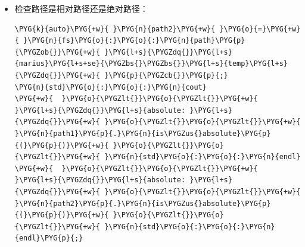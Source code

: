 \begin{itemize}
\begin{codeblockbg}
\begin{Verbatim}[commandchars=\\\{\},breaklines=true,breakanywhere=true,fontsize=\codefont,xleftmargin=17bp]
\PYG{+w}{  }\PYG{o}{\PYGZlt{}}\PYG{o}{\PYGZlt{}}\PYG{+w}{ }\PYG{l+s}{\PYGZdq{}}\PYG{l+s}{has stem: }\PYG{l+s}{\PYGZdq{}}\PYG{+w}{ }\PYG{o}{\PYGZlt{}}\PYG{o}{\PYGZlt{}}\PYG{+w}{ }\PYG{n}{path}\PYG{p}{.}\PYG{n}{has\PYGZus{}stem}\PYG{p}{(}\PYG{p}{)}\PYG{+w}{ }\PYG{o}{\PYGZlt{}}\PYG{o}{\PYGZlt{}}\PYG{+w}{ }\PYG{n}{std}\PYG{o}{:}\PYG{o}{:}\PYG{n}{endl}
\PYG{+w}{  }\PYG{o}{\PYGZlt{}}\PYG{o}{\PYGZlt{}}\PYG{+w}{ }\PYG{l+s}{\PYGZdq{}}\PYG{l+s}{has extension: }\PYG{l+s}{\PYGZdq{}}\PYG{+w}{ }\PYG{o}{\PYGZlt{}}\PYG{o}{\PYGZlt{}}\PYG{+w}{ }\PYG{n}{path}\PYG{p}{.}\PYG{n}{has\PYGZus{}extension}\PYG{p}{(}\PYG{p}{)}\PYG{+w}{ }\PYG{o}{\PYGZlt{}}\PYG{o}{\PYGZlt{}}\PYG{+w}{ }\PYG{n}{std}\PYG{o}{:}\PYG{o}{:}\PYG{n}{endl}\PYG{p}{;}
\end{Verbatim}
\end{codeblockbg}



\item 检查路径是相对路径还是绝对路径：



\begin{codeblockbg}
\begin{Verbatim}[commandchars=\\\{\},breaklines=true,breakanywhere=true,fontsize=\codefont,xleftmargin=17bp]
\PYG{k}{auto}\PYG{+w}{ }\PYG{n}{path2}\PYG{+w}{ }\PYG{o}{=}\PYG{+w}{ }\PYG{n}{fs}\PYG{o}{:}\PYG{o}{:}\PYG{n}{path}\PYG{p}{\PYGZob{}}\PYG{+w}{ }\PYG{l+s}{\PYGZdq{}}\PYG{l+s}{marius}\PYG{l+s+se}{\PYGZbs{}\PYGZbs{}}\PYG{l+s}{temp}\PYG{l+s}{\PYGZdq{}}\PYG{+w}{ }\PYG{p}{\PYGZcb{}}\PYG{p}{;}
\PYG{n}{std}\PYG{o}{:}\PYG{o}{:}\PYG{n}{cout}
\PYG{+w}{  }\PYG{o}{\PYGZlt{}}\PYG{o}{\PYGZlt{}}\PYG{+w}{ }\PYG{l+s}{\PYGZdq{}}\PYG{l+s}{absolute: }\PYG{l+s}{\PYGZdq{}}\PYG{+w}{ }\PYG{o}{\PYGZlt{}}\PYG{o}{\PYGZlt{}}\PYG{+w}{ }\PYG{n}{path1}\PYG{p}{.}\PYG{n}{is\PYGZus{}absolute}\PYG{p}{(}\PYG{p}{)}\PYG{+w}{ }\PYG{o}{\PYGZlt{}}\PYG{o}{\PYGZlt{}}\PYG{+w}{ }\PYG{n}{std}\PYG{o}{:}\PYG{o}{:}\PYG{n}{endl}
\PYG{+w}{  }\PYG{o}{\PYGZlt{}}\PYG{o}{\PYGZlt{}}\PYG{+w}{ }\PYG{l+s}{\PYGZdq{}}\PYG{l+s}{absolute: }\PYG{l+s}{\PYGZdq{}}\PYG{+w}{ }\PYG{o}{\PYGZlt{}}\PYG{o}{\PYGZlt{}}\PYG{+w}{ }\PYG{n}{path2}\PYG{p}{.}\PYG{n}{is\PYGZus{}absolute}\PYG{p}{(}\PYG{p}{)}\PYG{+w}{ }\PYG{o}{\PYGZlt{}}\PYG{o}{\PYGZlt{}}\PYG{+w}{ }\PYG{n}{std}\PYG{o}{:}\PYG{o}{:}\PYG{n}{endl}\PYG{p}{;}
\end{Verbatim}
\end{codeblockbg}




\end{itemize}
